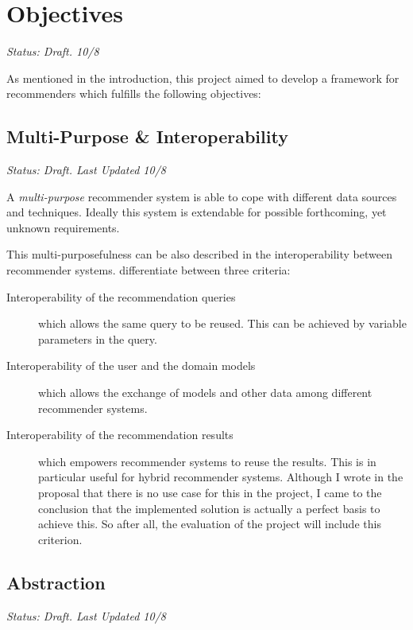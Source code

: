 \section{Objectives}

\emph{Status: Draft. 10/8}

As mentioned in the introduction, this project aimed to develop a framework for recommenders which fulfills the following objectives:

\subsection{Multi-Purpose \& Interoperability}
\label{intro-objectives-multipurpose}

\emph{Status: Draft. Last Updated 10/8}

A \emph{multi-purpose} recommender system is able to cope with different data sources and techniques. Ideally this system is extendable for possible forthcoming, yet unknown requirements.

This multi-purposefulness can be also described in the interoperability between recommender systems. \citet{manouselis07} differentiate between three criteria:

\begin{description}
    \item[Interoperability of the recommendation queries] which allows the same query to be reused. This can be achieved by variable parameters in the query.
    \item[Interoperability of the user and the domain models] which allows the exchange of models and other data among different recommender systems.
    \item[Interoperability of the recommendation results] which empowers recommender systems to reuse the results. This is in particular useful for hybrid recommender systems. Although I wrote in the proposal that there is no use case for this in the project, I came to the conclusion that the implemented solution is actually a perfect basis to achieve this. So after all, the evaluation of the project will include this criterion.
\end{description}

\subsection{Abstraction}
\label{intro-objectives-abstraction}

\emph{Status: Draft. Last Updated 10/8}

